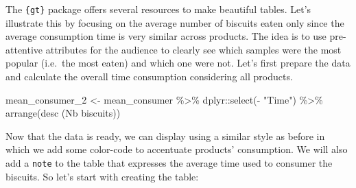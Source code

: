 \documentclass[
]{krantz}
\makeatletter
\newenvironment{Shaded}{\begin{snugshade}}{\end{snugshade}}
\newcommand{\AttributeTok}[1]{\textcolor[rgb]{0.61,0.61,0.61}{#1}}
\newcommand{\DecValTok}[1]{\textcolor[rgb]{0.06,0.06,0.06}{#1}}
\newcommand{\FunctionTok}[1]{\textcolor[rgb]{0,0,0}{#1}}
\newcommand{\NormalTok}[1]{#1}
\newcommand{\OtherTok}[1]{\textcolor[rgb]{0.37,0.37,0.37}{#1}}
\newcommand{\SpecialCharTok}[1]{\textcolor[rgb]{0,0,0}{#1}}
\newcommand{\StringTok}[1]{\textcolor[rgb]{0.5,0.5,0.5}{#1}}
\newenvironment{kframe}{%
\medskip{}
\setlength{\fboxsep}{.8em}
 \def\at@end@of@kframe{}%
 \ifinner\ifhmode%
  \def\at@end@of@kframe{\end{minipage}}%
  \begin{minipage}{\columnwidth}%
 \fi\fi%
 \def\FrameCommand##1{\hskip\@totalleftmargin \hskip-\fboxsep
 \colorbox{shadecolor}{##1}\hskip-\fboxsep
     \hskip-\linewidth \hskip-\@totalleftmargin \hskip\columnwidth}%
 \MakeFramed {\advance\hsize-\width
   \@totalleftmargin\z@ \linewidth\hsize
   \@setminipage}}%
 {\par\unskip\endMakeFramed%
 \at@end@of@kframe}
\renewenvironment{Shaded}{\begin{kframe}}{\end{kframe}}
\makeatother
\begin{document}
The \texttt{\{gt\}} package offers several resources to make beautiful tables. Let's illustrate this by focusing on the average number of biscuits eaten only since the average consumption time is very similar across products. The idea is to use pre-attentive attributes for the audience to clearly see which samples were the most popular (i.e.~the most eaten) and which one were not. Let's first prepare the data and calculate the overall time consumption considering all products.

\begin{Shaded}
\begin{Highlighting}[]
\NormalTok{mean\_consumer\_2 }\OtherTok{\textless{}{-}}\NormalTok{ mean\_consumer }\SpecialCharTok{\%\textgreater{}\%}
\NormalTok{  dplyr}\SpecialCharTok{::}\FunctionTok{select}\NormalTok{(}\SpecialCharTok{{-}} \StringTok{"Time"}\NormalTok{) }\SpecialCharTok{\%\textgreater{}\%}
  \FunctionTok{arrange}\NormalTok{(}\FunctionTok{desc}\NormalTok{ (}\StringTok{\textasciigrave{}}\AttributeTok{Nb biscuits}\StringTok{\textasciigrave{}}\NormalTok{))}
\end{Highlighting}
\end{Shaded}

Now that the data is ready, we can display using a similar style as before in which we add some color-code to accentuate products' consumption. We will also add a \texttt{note} to the table that expresses the average time used to consumer the biscuits. So let's start with creating the table:

\begin{Shaded}
\end{Shaded}
\end{document}
